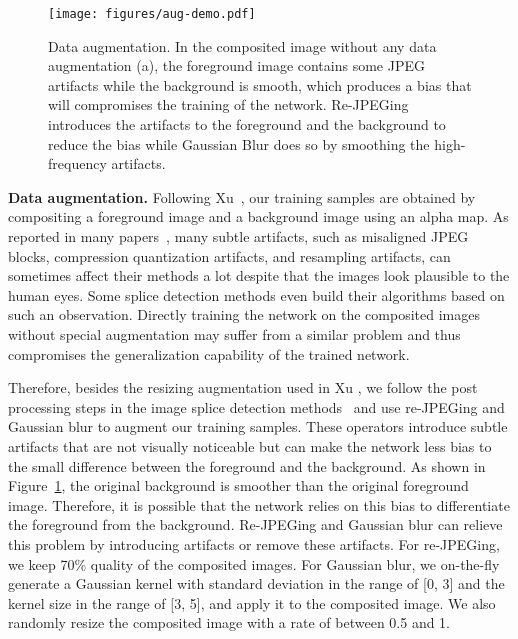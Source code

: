 \documentclass[10pt,twocolumn,letterpaper]{article}
\begin{document}
\begin{figure}[t]
	\centering
	\texttt{[image: figures/aug-demo.pdf]}
	\caption{Data augmentation. In the composited image without any data augmentation (a), the foreground image contains some JPEG artifacts while the background is smooth, which produces a bias that will compromises the training of the network. Re-JPEGing introduces the artifacts to the foreground and the background to reduce the bias while Gaussian Blur does so by smoothing the high-frequency artifacts.}\vspace{-0.2in}
	\label{fig:aug-demo}
\end{figure}


\noindent\textbf{Data augmentation.} Following Xu~\etal\cite{xu2017deep}, our training samples are obtained by compositing a foreground image and a background image using an alpha map. As reported in many papers~\cite{agarwal2017photo, de1994learning, ghosh2017detection, huang2010detecting, huh2018fighting,  liu2011detection, luo2010jpeg,  popescu2005exposing, swaminathan2008digital}, many subtle artifacts, such as misaligned JPEG blocks, compression quantization artifacts, and resampling artifacts, can sometimes affect their methods a lot despite that the images look  plausible to the human eyes. Some splice detection methods \cite{agarwal2017photo, huang2010detecting, huh2018fighting,  luo2010jpeg, popescu2005exposing, swaminathan2008digital} even build their algorithms based on such an observation. Directly training the network on the composited images without special augmentation may suffer from a similar problem and thus compromises the generalization capability of the trained network. 

Therefore, besides the resizing augmentation used in Xu \etal\cite{xu2017deep}, we follow the post processing steps in the image splice detection methods~\cite{de2013exposing, huh2018fighting, ng2004data} and use re-JPEGing and Gaussian blur to augment our training samples. These operators  introduce subtle artifacts that are not visually noticeable but can make the network less bias to the small difference between the foreground and the background. As shown in Figure~\ref{fig:aug-demo}, the original background is smoother than the original foreground image. Therefore, it is possible that the network relies on this bias to differentiate the foreground from the background. Re-JPEGing and Gaussian blur can relieve this problem by introducing artifacts or remove these artifacts. For re-JPEGing, we keep 70\% quality of the composited images. For Gaussian blur, we on-the-fly generate a Gaussian kernel with standard deviation in the range of [0, 3] and the kernel size in the range of [3, 5], and apply it to the composited image. We also randomly resize the composited image with a rate of between 0.5 and 1.
\end{document}
